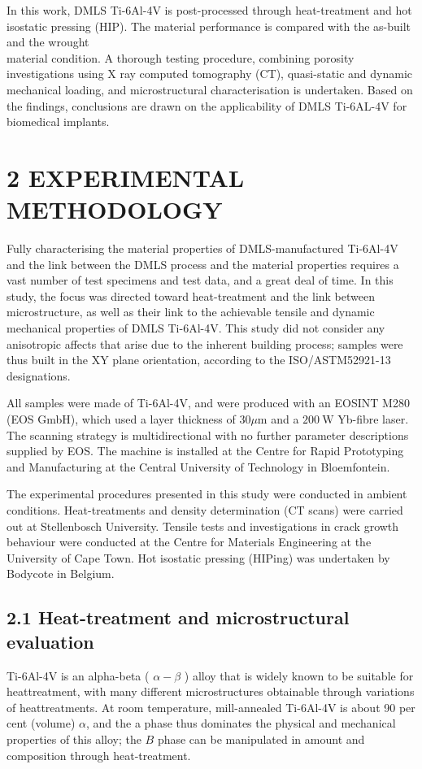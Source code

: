 \documentclass[10pt]{article}
\begin{document}
In this work, DMLS Ti-6Al-4V is post-processed through heat-treatment and hot isostatic pressing (HIP). The material performance is compared with the as-built and the wrought\\
material condition. A thorough testing procedure, combining porosity investigations using $\mathrm{X}$ ray computed tomography (CT), quasi-static and dynamic mechanical loading, and microstructural characterisation is undertaken. Based on the findings, conclusions are drawn on the applicability of DMLS Ti-6AL-4V for biomedical implants.

\section*{2 EXPERIMENTAL METHODOLOGY}
Fully characterising the material properties of DMLS-manufactured Ti-6Al-4V and the link between the DMLS process and the material properties requires a vast number of test specimens and test data, and a great deal of time. In this study, the focus was directed toward heat-treatment and the link between microstructure, as well as their link to the achievable tensile and dynamic mechanical properties of DMLS Ti-6Al-4V. This study did not consider any anisotropic affects that arise due to the inherent building process; samples were thus built in the XY plane orientation, according to the ISO/ASTM52921-13 designations.

All samples were made of Ti-6Al-4V, and were produced with an EOSINT M280 (EOS GmbH), which used a layer thickness of $30 \mu \mathrm{m}$ and a $200 \mathrm{~W}$ Yb-fibre laser. The scanning strategy is multidirectional with no further parameter descriptions supplied by EOS. The machine is installed at the Centre for Rapid Prototyping and Manufacturing at the Central University of Technology in Bloemfontein.

The experimental procedures presented in this study were conducted in ambient conditions. Heat-treatments and density determination (CT scans) were carried out at Stellenbosch University. Tensile tests and investigations in crack growth behaviour were conducted at the Centre for Materials Engineering at the University of Cape Town. Hot isostatic pressing (HIPing) was undertaken by Bodycote in Belgium.

\subsection*{2.1 Heat-treatment and microstructural evaluation}
Ti-6Al-4V is an alpha-beta ( $\alpha-\beta$ ) alloy that is widely known to be suitable for heattreatment, with many different microstructures obtainable through variations of heattreatments. At room temperature, mill-annealed Ti-6Al-4V is about 90 per cent (volume) $\alpha$, and the a phase thus dominates the physical and mechanical properties of this alloy; the $B$ phase can be manipulated in amount and composition through heat-treatment.
\end{document}
